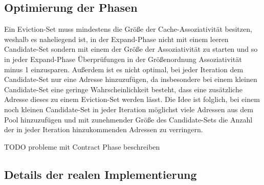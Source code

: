 


\subsection{Optimierung der Phasen}

Ein Eviction-Set muss mindestens die Größe der Cache-Assoziativität besitzen, weshalb es naheliegend ist, in der Expand-Phase nicht mit einem leeren Candidate-Set sondern mit einem der Größe der Assoziativität zu starten und so in jeder Expand-Phase Überprüfungen in der Größenordnung Assoziativität minus 1 einzusparen.
Außerdem ist es nicht optimal, bei jeder Iteration dem Candidate-Set nur eine Adresse hinzuzufügen, da insbesondere bei einem kleinen Candidate-Set eine geringe Wahrscheinlichkeit besteht, dass eine zusätzliche Adresse dieses zu einem Eviction-Set werden lässt.
Die Idee ist folglich, bei einem noch kleinen Candidate-Set in jeder Iteration möglichst viele Adressen aus dem Pool hinzuzufügen und mit zunehmender Größe des Candidate-Sets die Anzahl der in jeder Iteration hinzukommenden Adressen zu verringern.

TODO probleme mit Contract Phase beschreiben



\subsection{Details der realen Implementierung}

